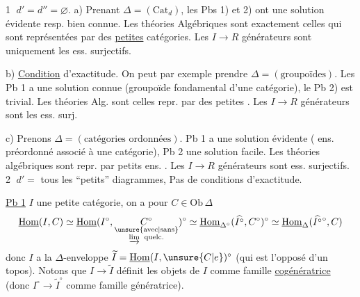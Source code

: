 \textcircled{1} $d'=d''=\varnothing$.  a) Prenant $\Delta=(\mathrm{Cat}_d)$, les Pbs 1) et 2) ont une solution évidente resp. bien connue. Les théories Algébriques sont exactement celles qui sont représentées par des \uline{petites} catégories. Les $I\longrightarrow R$ générateurs sont uniquement les ess. surjectifs.

b) \uline{Condition} d'exactitude. On peut par exemple prendre \uline{$\Delta=(\text{groupoïdes})$}.
Les  Pb 1 a une solution connue (groupoïde fondamental d'une catégorie), le Pb 2) est trivial. Les théories Alg. sont celles repr. par des petites  . Les $I\longrightarrow R$ générateurs sont les ess. surj.

c) Prenons $\Delta=(\text{catégories ordonnées})$. Pb 1 a une solution évidente ( ens. préordonné associé à une catégorie), Pb 2 une solution facile.
Les théories algébriques sont  repr. par petits ens. . Les $I\longrightarrow R$ générateurs sont ess. surjectifs.
\textcircled{2} $d'=$ tous les ``petits'' diagrammes,  Pas de conditions d'exactitude.

\uline{Pb 1} $I$ une petite catégorie, on a pour $C\in\mathrm{Ob}\,\Delta$
\[
\underline{\mathrm{Hom}}(I,C)\simeq\underline{\mathrm{Hom}}(I^\circ,
\underset{\substack{\text{\unsure{avec|sans}}\\\varinjlim\ \text{quelc.}}}{C^\circ})^{\circ}
\simeq\underline{\mathrm{Hom}}_{\Delta^\circ}(\widehat{I^\circ},C^\circ)^\circ
\simeq\underline{\mathrm{Hom}}_{\Delta}(\widehat{I^\circ}{}^\circ,C)
\]
donc $I$ a la $\Delta$-enveloppe $\widetilde I=\underline{\mathrm{Hom}}(I,\unsure{C|e})^\circ$ (qui est l'opposé d'un topos). Notons que $I\longrightarrow\widetilde I$ définit les objets de $I$ comme famille \uline{cogénératrice} (donc $I^\circ\longrightarrow\widetilde I^\circ$ comme famille génératrice).

